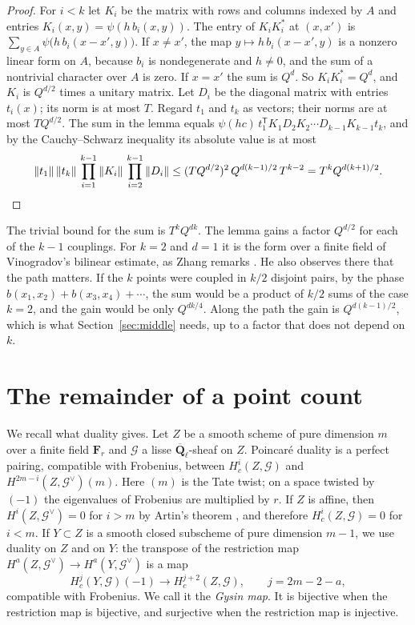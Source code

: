 \documentclass[11pt,a4paper]{article}
\theoremstyle{plain}
\theoremstyle{remark}
\newcommand{\Ql}{\overline{\mathbf Q}_\ell}
\newcommand{\G}{\mathcal G}
\begin{document}
\begin{proof}
For $i<k$ let $K_i$ be the matrix with rows and columns indexed by $A$ and entries $K_i(x,y)=\psi(h\,b_i(x,y))$. The
entry of $K_iK_i^*$ at $(x,x')$ is $\sum_{y\in A}\psi\bigl(h\,b_i(x-x',y)\bigr)$. If $x\ne x'$, the map
$y\mapsto h\,b_i(x-x',y)$ is a nonzero linear form on $A$, because $b_i$ is nondegenerate and $h\ne0$, and the sum
of a nontrivial character over $A$ is zero. If $x=x'$ the sum is $Q^d$. So $K_iK_i^*=Q^d$, and $K_i$ is $Q^{d/2}$
times a unitary matrix. Let $D_i$ be the diagonal matrix with entries $t_i(x)$; its norm is at most $T$. Regard
$t_1$ and $t_k$ as vectors; their norms are at most $TQ^{d/2}$. The sum in the lemma equals
$\psi(hc)\,t_1^{\mathsf T}K_1D_2K_2\cdots D_{k-1}K_{k-1}t_k$, and by the Cauchy--Schwarz inequality its absolute value
is at most
\[
\|t_1\|\,\|t_k\|\,\prod_{i=1}^{k-1}\|K_i\|\,\prod_{i=2}^{k-1}\|D_i\|\le(TQ^{d/2})^2\,Q^{d(k-1)/2}\,T^{k-2}
=T^kQ^{d(k+1)/2}.\qedhere
\]
\end{proof}

The trivial bound for the sum is $T^kQ^{dk}$. The lemma gains a factor $Q^{d/2}$ for each of the $k-1$ couplings.
For $k=2$ and $d=1$ it is the form over a finite field of Vinogradov's bilinear estimate, as Zhang remarks
\cite[Remark 2.7]{Zhang}. He also observes there that the path matters. If the $k$ points were coupled in $k/2$
disjoint pairs, by the phase $b(x_1,x_2)+b(x_3,x_4)+\cdots$, the sum would be a product of $k/2$ sums of the case
$k=2$, and the gain would be only $Q^{dk/4}$. Along the path the gain is $Q^{d(k-1)/2}$, which is what
Section~\ref{sec:middle} needs, up to a factor that does not depend on $k$.

\section{The remainder of a point count}\label{sec:remainder}

We recall what duality gives. Let $Z$ be a smooth scheme of pure dimension $m$ over a finite field $\mathbf F_r$ and
$\G$ a lisse $\Ql$-sheaf on $Z$. Poincar\'e duality \cite[XVIII, \S3]{SGA4} is a perfect pairing, compatible with
Frobenius, between $H^i_c(Z,\G)$ and $H^{2m-i}(Z,\G^\vee)(m)$. Here $(m)$ is the Tate twist; on a space twisted by
$(-1)$ the eigenvalues of Frobenius are multiplied by $r$. If $Z$ is affine, then $H^i(Z,\G^\vee)=0$ for $i>m$ by
Artin's theorem \cite[XIV, 3.1]{SGA4}, and therefore $H^i_c(Z,\G)=0$ for $i<m$. If $Y\subset Z$ is a smooth closed
subscheme of pure dimension $m-1$, we use duality on $Z$ and on $Y$: the transpose of the restriction map
$H^a(Z,\G^\vee)\to H^a(Y,\G^\vee)$ is a map
\[
H^j_c(Y,\G)(-1)\longrightarrow H^{j+2}_c(Z,\G),\qquad j=2m-2-a,
\]
compatible with Frobenius. We call it the \emph{Gysin map}. It is bijective when the restriction map is bijective,
and surjective when the restriction map is injective.
\end{document}
